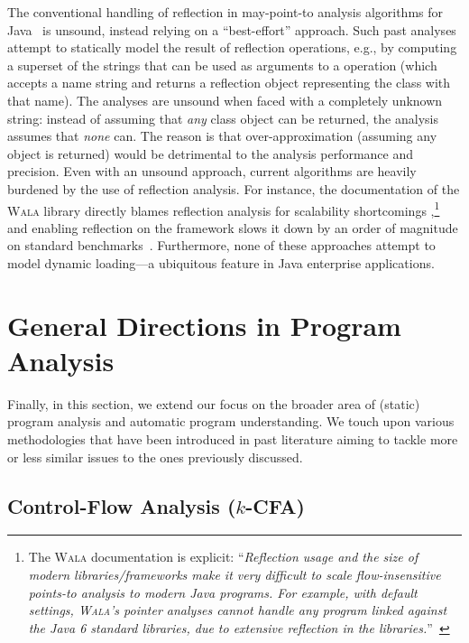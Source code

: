 The conventional handling of reflection in may-point-to analysis algorithms for Java~\cite{www:wala-reflection,ecoop:2014:Li,aplas:2005:Livshits,thesis:Livshits,aplas:2015:Smaragdakis,sas:2015:Li} is unsound, instead relying on a ``best-effort'' approach.  Such past analyses attempt to statically model the result of reflection operations, e.g., by computing a superset of the strings that can be used as arguments to a  operation (which accepts a name string and returns a reflection object representing the class with that name). The analyses are unsound when faced with a completely unknown string: instead of assuming that \emph{any} class object can be returned, the analysis assumes that \emph{none} can. The reason is that over-approximation (assuming any object is returned) would be detrimental to the analysis performance and precision. Even with an unsound approach, current algorithms are heavily burdened by the use of reflection analysis. For instance, the documentation of the \textsc{Wala} library directly blames reflection analysis for scalability shortcomings \cite{www:wala-reflection},\footnote{The \textsc{Wala} documentation is explicit: ``\emph{Reflection usage and the size of modern libraries/frameworks make it very difficult to scale flow-insensitive points-to analysis to modern Java programs. For example, with default settings, \textsc{Wala}'s pointer analyses cannot handle any program linked against the Java 6 standard libraries, due to extensive reflection in the libraries.}''~\cite{www:wala-reflection}} and enabling reflection on the \doop{} framework slows it down by an order of magnitude on standard benchmarks~\cite{aplas:2015:Smaragdakis}. Furthermore, none of these approaches attempt to model dynamic loading---a ubiquitous feature in Java enterprise applications.



\section{General Directions in Program Analysis}

Finally, in this section, we extend our focus on the broader area of (static) program analysis and automatic program understanding. We touch upon various methodologies that have been introduced in past literature aiming to tackle more or less similar issues to the ones previously discussed.


\subsection{Control-Flow Analysis (\texorpdfstring{$k$}{k}-CFA)}

